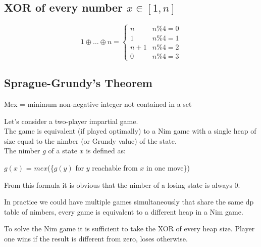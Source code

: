 \subsection{XOR of every number $x \in [1, n]$}
\[1 \oplus \ldots \oplus n =
	\begin{cases}
		n & n \% 4 = 0 \\
		1 & n \% 4 = 1 \\
		n + 1 & n \% 4 = 2 \\
		0 & n \% 4 = 3
	\end{cases}
\]


\subsection{Sprague-Grundy's Theorem}
Mex = minimum non-negative integer not contained in a set

Let's consider a two-player impartial game. \\
The game is equivalent (if played optimally) to a Nim game with a single
heap of size equal to the nimber (or Grundy value) of the state. \\
The nimber $g$ of a state $x$ is defined as:

$g(x)$ = $mex$(\{$g(y)$ for $y$ reachable from $x$ in one move\})

From this formula it is obvious that the nimber of a losing state is always 0.

In practice we could have multiple games simultaneously that share the same
dp table of nimbers, every game is equivalent to a different heap in a Nim game.

To solve the Nim game it is sufficient to take the XOR of every heap size.
Player one wins if the result is different from zero, loses otherwise.

